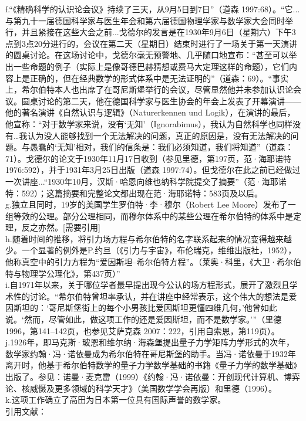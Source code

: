 f.“《精确科学的认识论会议》持续了三天，从9月5日到7日”（道森 1997:68）。“它...与第九十一届德国科学家与医生年会和第六届德国物理学家与数学家大会同时举行，并且紧接在这些大会之前...戈德尔的发言是在1930年9月6日（星期六）下午3点到3点20分进行的，会议在第二天（星期日）结束时进行了一场关于第一天演讲的圆桌讨论。在这场讨论中，戈德尔毫无预警地、几乎随口地宣布：“甚至可以举出一些命题的例子（实际上是像哥德巴赫猜想或费马大定理这样的命题），它们内容上是正确的，但在经典数学的形式体系中是无法证明的”（道森：69）。“事实上，希尔伯特本人也出席了在哥尼斯堡举行的会议，尽管显然他并未参加认识论会议。圆桌讨论的第二天，他在德国科学家与医生协会的年会上发表了开幕演讲——他的著名演讲《自然认识与逻辑》（Naturerkennen und Logik），在演讲的最后，他宣称：“对于数学家来说，没有‘无知’（Ignorabimus），我认为自然科学也同样没有…我认为没人能够找到一个无法解决的问题，真正的原因是，没有无法解决的问题。与愚蠢的‘无知’相对，我们的信条是：我们必须知道，我们将知道”（道森：71）。戈德尔的论文于1930年11月17日收到（参见里德，第197页，范·海耶诺特 1976:592），并于1931年3月25日出版（道森 1997:74）。但戈德尔在此之前已经做过一次讲座...“1930年10月，汉斯·哈恩向维也纳科学院提交了摘要”（范·海耶诺特：592）；这篇摘要和完整论文都出现在范·海耶诺特：583页及以后。\\
g.独立且同时，19岁的美国学生罗伯特·李·穆尔（Robert Lee Moore）发布了一组等效的公理。部分公理相同，而穆尔体系中的某些公理在希尔伯特的体系中是定理，反之亦然。[需要引用]\\
h.随着时间的推移，将引力场方程与希尔伯特的名字联系起来的情况变得越来越少。一个显著的例外是P.约旦（《引力与宇宙》，布伦瑞克，维维出版社，1952），他称真空中的引力方程为“爱因斯坦–希尔伯特方程”。（莱奥·科里，《大卫·希尔伯特与物理学公理化》，第437页）”\\
i.自1971年以来，关于哪位学者最早提出现今公认的场方程形式，展开了激烈且学术性的讨论。“希尔伯特曾坦率承认，并在讲座中经常表示，这个伟大的想法是爱因斯坦的：‘哥尼斯堡街上的每个小男孩比爱因斯坦更懂四维几何，’他曾如此说。‘然而，尽管如此，做这项工作的还是爱因斯坦，而不是数学家。’”（里德 1996，第141–142页，也参见艾萨克森 2007：222，引用自索恩，第119页）。\\
j.1926年，即马克斯·玻恩和维尔纳·海森堡提出量子力学矩阵力学形式的次年，数学家约翰·冯·诺依曼成为希尔伯特在哥尼斯堡的助手。当冯·诺依曼于1932年离开时，他基于希尔伯特数学的量子力学数学基础的书籍《量子力学的数学基础》出版了。参见：诺曼·麦克雷（1999）《约翰·冯·诺依曼：开创现代计算机、博弈论、核威慑及更多领域的科学天才》（美国数学学会再版）和里德（1996）。\\
k.这项工作确立了高田为日本第一位具有国际声誉的数学家。\\
引用文献：

